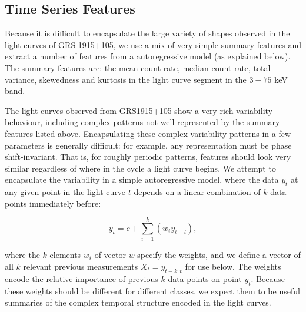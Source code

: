 \documentclass[12pt]{emulateapj}
\begin{document}
\subsection{Time Series Features}

Because it is difficult to encapsulate the large variety of shapes observed in the light curves of GRS 1915+105, we use a mix of very simple summary features and extract a number of features from a autoregressive model (as explained below). The summary features are: the mean count rate, median count rate, total variance, skewedness and kurtosis in the light curve segment in the $3 - 75$ keV band. 

The light curves observed from GRS1915+105 show a very rich variability behaviour, including complex patterns not well represented by the summary features listed above. Encapsulating these complex variability patterns in a few parameters is generally difficult: for example, any representation must be phase shift-invariant. That is, for roughly periodic patterns, features should look very similar regardless of where in the cycle a light curve begins. We attempt to encapsulate the variability in a simple autoregressive model, where the data $y_t$ at any given point in the light curve $t$ depends on a linear combination of $k$ data points immediately before:

\begin{equation}
y_{t} = c + \sum_{i=1}^k{\left( w_i y_{t-i}\right)} ,
\end{equation}

\noindent  where the $k$ elements $w_i$ of vector $w$ specify the weights, and we define a vector of all $k$ relevant previous measurements $X_t = y_{t-k:t}$ for use below. The weights encode the relative importance of previous $k$ data points on point $y_{t}$. Because these weights should be different for different classes, we expect them to be useful summaries of the complex temporal structure encoded in the light curves.
\end{document}

